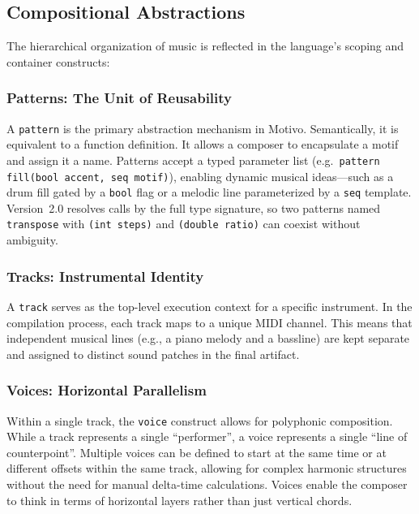 \subsection{Compositional Abstractions}\label{detail-subsec:compositional-abstractions}

The hierarchical organization of music is reflected in the language's scoping and container constructs:

\subsubsection{Patterns: The Unit of Reusability}
A \texttt{pattern} is the primary abstraction mechanism in Motivo\@.
Semantically, it is equivalent to a function definition.
It allows a composer to encapsulate a motif and assign it a name.
Patterns accept a typed parameter list (e.g.\ \texttt{pattern fill(bool accent, seq motif)}), enabling dynamic musical
ideas---such as a drum fill gated by a \texttt{bool} flag or a melodic line parameterized by a \texttt{seq} template.
Version~2.0 resolves calls by the full type signature, so two patterns named \texttt{transpose} with
\texttt{(int steps)} and \texttt{(double ratio)} can coexist without ambiguity.

\subsubsection{Tracks: Instrumental Identity}
A \texttt{track} serves as the top-level execution context for a specific instrument.
In the compilation process, each track maps to a unique MIDI channel.
This means that independent musical lines (e.g., a piano melody and a bassline) are kept separate and assigned to
distinct sound patches in the final artifact.

\subsubsection{Voices: Horizontal Parallelism}
Within a single track, the \texttt{voice} construct allows for polyphonic composition.
While a track represents a single ``performer'', a voice represents a single ``line of counterpoint''.
Multiple voices can be defined to start at the same time or at different offsets within the same track, allowing for
complex harmonic structures without the need for manual delta-time calculations.
Voices enable the composer to think in terms of horizontal layers rather than just vertical chords.

